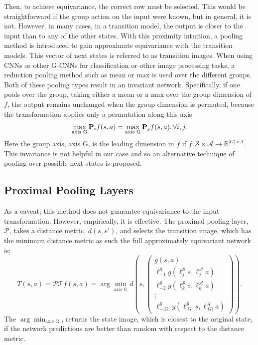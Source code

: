 Then, to achieve equivariance, the correct row must be selected. This would be straightforward if the group action on the input were known, but in general, it is not. However, in many cases, in a transition model, the output is closer to the input than to any of the other states. With this proximity intuition, a pooling method is introduced to gain approximate equivariance with the transition models. This vector of next states is referred to as transition images.
When using CNNs or other G-CNNs for classification or other image processing tasks, a reduction pooling method such as mean or max is used over the different groups. Both of these pooling types result in an invariant network. Specifically, if one pools over the group, taking either a mean or a max over the group dimension of $f$, the output remains unchanged when the group dimension is permuted, because the transformation applies only a permutation along this axis
\begin{equation}
	\max_\text{axis G} \mathbf{P}_i f(s, a) = \max_\text{axis G} \mathbf{P}_j f(s, a), \forall i, j.
\end{equation}
Here the group axis, axis G, is the leading dimension in $f$ if $f: \mathcal{S} \times \mathcal{A} \rightarrow \mathbb{R}^{|G| \times \mathcal{S}}$. This invariance is not helpful in our case and so an alternative technique of pooling over possible next states is proposed.


\subsection{Proximal Pooling Layers}\label{sec:proximal_pool}
As a caveat, this method does not guarantee equivariance to the input transformation. However, empirically, it is effective. The proximal pooling layer, $\mathcal{P}$, takes a distance metric, $d(s, s')$, and selects the transition image, which has the minimum distance metric as such the full approximately equivariant network is;
\begin{equation}
	T(s, a) = \mathcal{P}\mathcal{T}f(s, a)  =\arg \min_\text{axis G} d \left (s,  \begin{pmatrix}
			g(s, a)                                                          \\
			\ell_{-1}^\mathcal{S}g(\ell_j^\mathcal{S}s,\ell^\mathcal{A}_ja)  \\
			\ell_{-2}^\mathcal{S}g(\ell^\mathcal{S}_ks, \ell^\mathcal{A}_ka) \\
			\vdots                                                           \\
			\ell_{-|G|}^\mathcal{S}g(\ell_{|G|}^\mathcal{S}s, \ell^\mathcal{A}_{|G|}a)
		\end{pmatrix}
	\right ).
\end{equation}
The $\arg \min_\text{axis G}$, returns the state image, which is closest to the original state, if the network predictions are better than random with respect to the distance metric.

